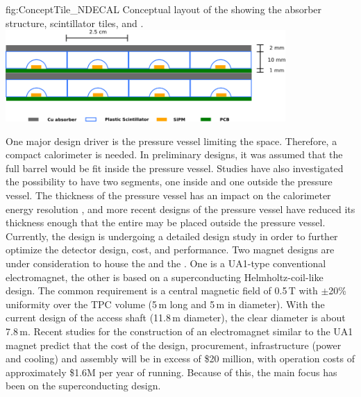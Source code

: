 \begin{dunefigure}[Conceptual layout of the \dshort{mpd} \dshort{ecal}] %
{fig:ConceptTile_NDECAL}
{Conceptual layout of the  showing the absorber structure, scintillator tiles,  and .}
\includegraphics[width=0.8\textwidth]{graphics/TileConcept.png}
\end{dunefigure}

One major design driver is the pressure vessel limiting the space. Therefore, a compact calorimeter is needed. In preliminary designs, it was assumed that the full  barrel would be fit inside the pressure vessel. Studies have also investigated the possibility to have two segments, one inside and one outside the pressure vessel.  The thickness of the pressure vessel has an impact on the calorimeter energy resolution \cite{Emberger:2018pgr}, and more recent designs of the pressure vessel have reduced its thickness enough that the entire  may be placed outside the pressure vessel. Currently, the  design is undergoing a detailed design study in order to further optimize the detector design, cost, and performance.  
%
\label{sssec:nd:appx:mpd-magnet}
%
Two magnet designs are under consideration to house the  and the . One is a UA1-type conventional electromagnet, the other is based on a superconducting Helmholtz-coil-like design. The common requirement is a central magnetic field of 0.5\,T with $\pm$20\% uniformity over the TPC volume (5\,m long and 5\,m in diameter). With the current design of the access shaft (11.8\,m diameter), the clear diameter is about 7.8\,m. Recent studies for the construction of an electromagnet similar to the UA1 magnet predict that the cost of the design, procurement, infrastructure (power and cooling) and assembly will be in excess of \$20 million, with operation costs of approximately \$1.6M per year of running.  Because of this, the main focus has been on the superconducting design.
%
